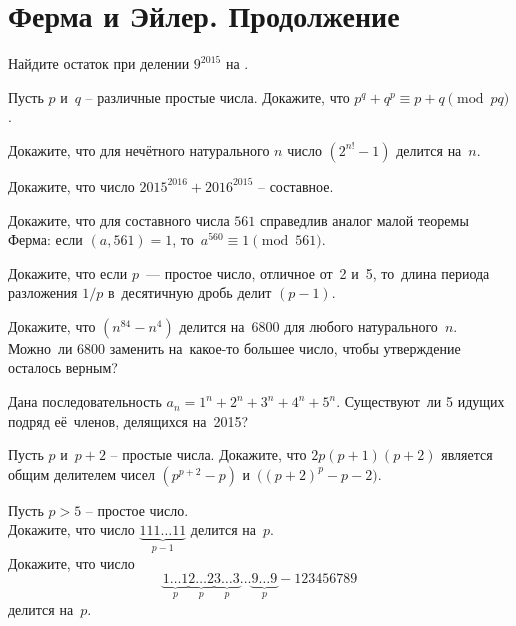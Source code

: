 
\section*{Ферма и Эйлер. Продолжение}



\begin{problems}

\item
Найдите остаток при делении $9^{2015}$ на
\quad
{}
\quad
{}.

\item
Пусть $p$ и~$q$ -- различные простые числа.
Докажите, что
\(
    p^q + q^p
\equiv
    p + q
\pmod{p q}
\).


\item
Докажите, что для нечётного натурального $n$ число $(2^{n!} - 1)$ делится
на~$n$.

\item
Докажите, что число $2015^{2016} + 2016^{2015}$ -- составное.

\item
Докажите, что для составного числа $561$ справедлив аналог малой теоремы Ферма:
если $(a, 561) = 1$, то~$a^{560} \equiv 1 \pmod{561}$.

\item
Докажите, что если $p$~--- простое число, отличное от~2 и~5, то~длина периода
разложения $1 / p$ в~десятичную дробь делит $(p - 1)$.

\item
\sp
Докажите, что $(n^{84} - n^4)$ делится на~6800 для любого натурального~$n$.
\\
\sp
Можно~ли 6800 заменить на~какое-то большее число, чтобы утверждение осталось
верным?

\item
Дана последовательность $a_n = 1^n + 2^n + 3^n + 4^n + 5^n$.
Существуют~ли 5 идущих подряд её~членов, делящихся на~2015?

\item
Пусть $p$ и~$p + 2$ -- простые числа.
Докажите, что $2 p (p + 1) (p + 2)$ является общим делителем чисел
$(p^{p+2} - p)$ и~$\bigl( (p + 2)^p - p - 2 \bigr)$.

\item
Пусть $p > 5$ -- простое число.
\\
\sp
Докажите, что число $\underbrace{111 \ldots 11}_{p - 1}$ делится на~$p$.
\\
\sp
Докажите, что число
\[
    \underbrace{1 \ldots 1}_{p}
    \underbrace{2 \ldots 2}_{p}
    \underbrace{3 \ldots 3}_{p}
    \ldots
    \underbrace{9 \ldots 9}_{p}
    - 123456789
\]
делится на~$p.$


\end{problems}

